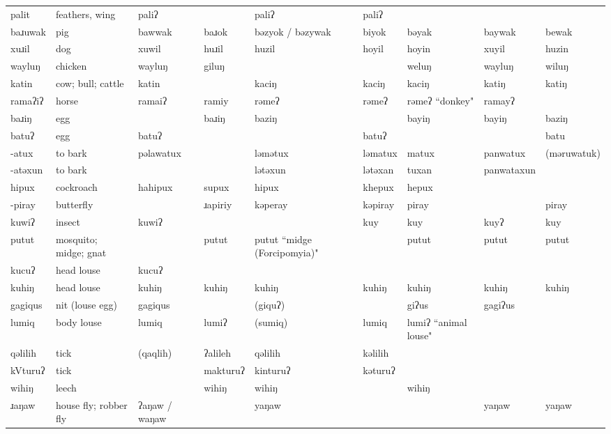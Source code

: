 \begin{landscape}
\begin{longtable}{*{9}{p{}}}
\text{*}palit & feathers, wing & paliʔ &  & paliʔ & paliʔ &  &  & \\
\text{*}baɹuwak & pig & bawwak & baɹok & bəzyok / bəzywak & biyok & bəyak & baywak & bewak\\
\text{*}xuɹil & dog & xuwil & huɹil & huzil & hoyil & hoyin & xuyil & huzin\\
\text{*}wayluŋ & chicken & wayluŋ & giluŋ &  &  & weluŋ & wayluŋ & wiluŋ\\
\text{*}katin & cow; bull; cattle & katin &  & kaciŋ & kaciŋ & kaciŋ & katiŋ & katiŋ\\
\text{*}ramaʔiʔ & horse & ramaiʔ & ramiy & rəmeʔ & rəmeʔ & rəmeʔ ``donkey" & ramayʔ & \\
\text{*}baɹiŋ & egg &  & baɹiŋ & baziŋ &  & bayiŋ & bayiŋ & baziŋ\\
\text{*}batuʔ & egg & batuʔ &  &  & batuʔ &  &  & batu\\
\text{*}-atux & to bark & pəlawatux &  & ləmətux & ləmatux & matux & panwatux & (məruwatuk)\\
\text{*}-atəxun & to bark &  &  & lətəxun & lətəxan & tuxan & panwataxun & \\
\text{*}hipux & cockroach & hahipux & supux & hipux & khepux & hepux &  & \\
\text{*}-piray & butterfly &  & ɹapiriy & kəperay & kəpiray & piray &  & piray\\
\text{*}kuwiʔ & insect & kuwiʔ &  &  & kuy & kuy & kuyʔ & kuy\\
\text{*}putut & mosquito; midge; gnat &  & putut & putut ``midge (Forcipomyia)" &  & putut & putut & putut\\
\text{*}kucuʔ & head louse & kucuʔ &  &  &  &  &  & \\
\text{*}kuhiŋ & head louse & kuhiŋ & kuhiŋ & kuhiŋ & kuhiŋ & kuhiŋ & kuhiŋ & kuhiŋ\\
\text{*}gagiqus & nit (louse egg) & gagiqus &  & (giquʔ) &  & giʔus & gagiʔus & \\
\text{*}lumiq & body louse & lumiq & lumiʔ & (sumiq) & lumiq & lumiʔ ``animal louse" &  & \\
\text{*}qəlilih & tick & (qaqlih) & ʔalileh & qəlilih & kəlilih &  &  & \\
\text{*}kVturuʔ & tick &  & makturuʔ & kinturuʔ & kəturuʔ &  &  & \\
\text{*}wihiŋ & leech &  & wihiŋ & wihiŋ &  & wihiŋ &  & \\
\text{*}ɹaŋaw & house fly; robber fly & ʔaŋaw / waŋaw &  & yaŋaw &  &  & yaŋaw & yaŋaw\\

\end{longtable}
\end{landscape}
